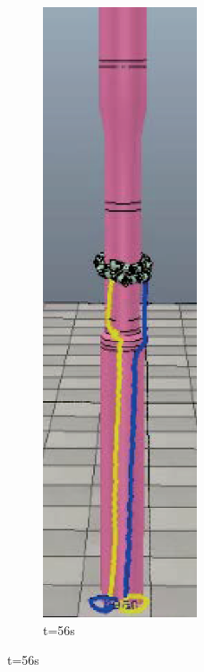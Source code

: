\begin{figure}[htbp]
	\begin{subfigure}{0.3\textwidth}{
			\centering
			\includegraphics[height=0.18\textheight,width=0.5\textwidth]{figure/chap05/BSB/1m17s.eps}
			\caption{t=56s}
		}
	\end{subfigure}

\end{figure}
